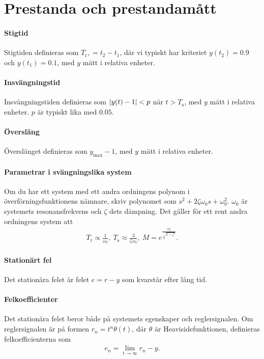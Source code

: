 \section{Prestanda och prestandamått}

\paragraph{Stigtid}
Stigtiden definieras som $T_{\text{r}}, = t_{2} - t_{1}$, där vi typiskt har kriteriet $y(t_{2}) = 0.9$ och $y(t_{1}) = 0.1$, med $y$ mätt i relativa enheter.

\paragraph{Insvängningstid}
Insvängningstiden definieras som $\abs{y(t) - 1} < p$ när $t > T_{\text{s}}$, med $y$ mätt i relativa enheter. $p$ är typiskt lika med $0.05$.

\paragraph{Översläng}
Överslänget definieras som $y_{\text{max}} - 1$, med $y$ mätt i relativa enheter.

\paragraph{Parametrar i svängningslika system}
Om du har ett system med ett andra ordningens polynom i överförningsfunktionens nämnare, skriv polynomet som $s^{2} + 2\zeta\omega_{0}s + \omega_{0}^{2}$. $\omega_{0}$ är systemets resonansfrekvens och $\zeta$ dets dämpning. Det gäller för ett rent andra ordningens system att
\begin{align*}
	T_{\text{r}} \propto \frac{1}{\omega_{0}},\ T_{\text{s}} \approx \frac{3}{\zeta\omega_{0}},\ M = e^{\frac{\pi\zeta}{\sqrt{1 - \zeta^{2}}}}.
\end{align*}

\paragraph{Stationärt fel}
Det stationära felet är felet $e = r - y$ som kvarstår efter lång tid.

\paragraph{Felkoefficienter}
Det stationära felet beror både på systemets egenskaper och reglersignalen. Om reglersignalen är på formen $r_{n} = t^{n}\theta(t)$, där $\theta$ är Heavisidefunktionen, definieras felkoefficienterna som
\begin{align*}
	e_{n} = \lim\limits_{t\to\infty}r_{n} - y.
\end{align*}